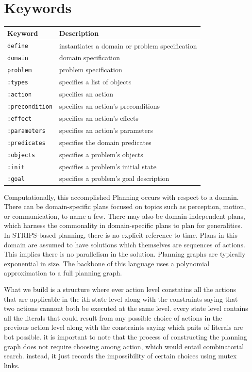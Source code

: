 \documentclass[
a4paper, %
11pt, %
onecolumn, %
openany, %
]{memoir}
\begin{document}
{\section{Keywords}
\begin{center}
\begin{tabular}{ l  l }
Keyword    & Description\\
\hline
\hline
\texttt{define}  & instantiates a domain or problem specification\\
\hline
\texttt{domain}  & domain specification \\
\hline
\texttt{problem} & problem specification \\
\hline
\texttt{:types}  & specifies a list of objects \\
\hline
\texttt{:action} & specifies an action \\
\hline
\texttt{:precondition} & specifies an action's preconditions \\
\hline
\texttt{:effect} & specifies an action's effects\\
\hline
\texttt{:parameters} & specifies an action's parameters\\
\hline
\texttt{:predicates} & specifies the domain predicates \\
\hline
\texttt{:objects} & specifies a problem's objects\\
\hline
\texttt{:init} & specifies a problem's initial state\\
\hline
\texttt{:goal} & specifies a problem's goal description\\
\hline
\end{tabular}
\end{center}




Computationally, this accomplished Planning occurs with respect to a domain. There can be domain-specific plans focused on topics such as perception, motion, or communication, to name a few. There may also be domain-independent plans, which harness the commonality in domain-specific plans to plan for generalities.\\

In STRIPS-based planning, there is no explicit reference to time. Plans in this domain are assumed to have solutions which themselves are sequences of actions. This implies there is no parallelism in the solution.  Planning graphs are typically exponential in size. The backbone of this language uses a polynomial approximation to a full planning graph.


What we build is a structure where ever action level constatins all the actions that are applicable in the ith state level along with the constraints saying that two actions cannont both be executed at the same level. every state level contains all the literals that could result from any possible choice of actions in the previous action level along with the constraints saying which paits of literals are bot possible. it is important to note that the process of constructing the planning graph does not require choosing among action, which would entail combinatorial search. instead, it just records the impossibility of certain choices using mutex links.\\

}
\end{document}
